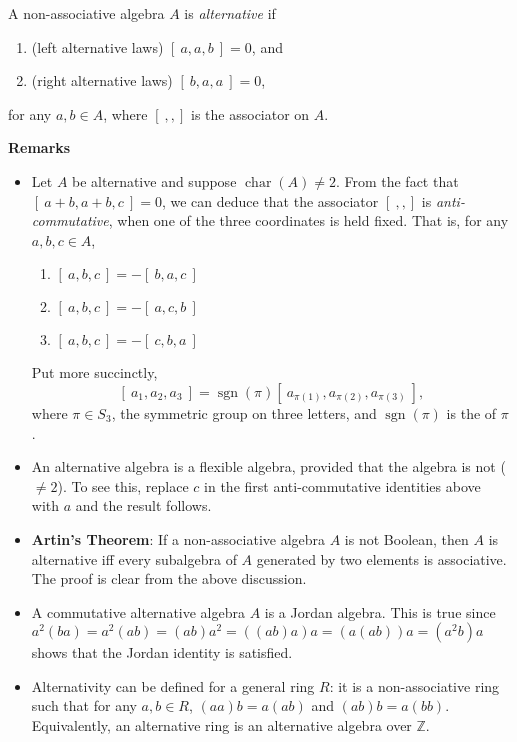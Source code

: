 \documentclass[12pt]{article}
\begin{document}
A non-associative algebra $A$ is \emph{alternative} if
\begin{enumerate}
\item (left alternative laws) $[\ a,a,b\ ]=0$, and
\item (right alternative laws) $[\ b,a,a\ ]=0$,
\end{enumerate}
for any $a,b\in A$, where $[\ , , ]$ is the associator on $A$.
\par
\textbf{Remarks}
\begin{itemize}
\item Let $A$ be alternative and suppose $\operatorname{char}(A)\neq2$.  From the fact that $[\ a+b,a+b,c\ ]=0$, we can deduce that the associator $[\ , , ]$ is \emph{anti-commutative}, when one of the three coordinates is held fixed.  That is, for any $a,b,c\in A$,
\begin{enumerate}
\item $[\ a,b,c\ ]=-[\ b,a,c\ ]$
\item $[\ a,b,c\ ]=-[\ a,c,b\ ]$
\item $[\ a,b,c\ ]=-[\ c,b,a\ ]$
\end{enumerate}
Put more succinctly, $$[\ a_1,a_2,a_3\ ]=\operatorname{sgn}(\pi)[\ a_{\pi(1)},a_{\pi(2)},a_{\pi(3)}\ ],$$ where $\pi\in S_3$, the symmetric group on three letters, and $\operatorname{sgn}(\pi)$ is the  of $\pi$.
\item An alternative algebra is a flexible algebra, provided that the algebra is not  ( $\neq2$).  To see this, replace $c$ in the first anti-commutative identities above with $a$ and the result follows.
\item \textbf{Artin's Theorem}:  If a non-associative algebra $A$ is not Boolean, then $A$ is alternative iff every subalgebra of $A$ generated by two elements is associative.  The proof is clear from the above discussion.
\item A commutative alternative algebra $A$ is a Jordan algebra.  This is true since $a^2(ba)=a^2(ab)=(ab)a^2=((ab)a)a=(a(ab))a=(a^2b)a$ shows that the Jordan identity is satisfied.
\item Alternativity can be defined for a general ring $R$: it is a non-associative ring such that for any $a,b\in R$, $(aa)b=a(ab)$ and $(ab)b=a(bb)$.  Equivalently, an alternative ring is an alternative algebra over $\mathbb{Z}$.
\end{itemize}
\end{document}
